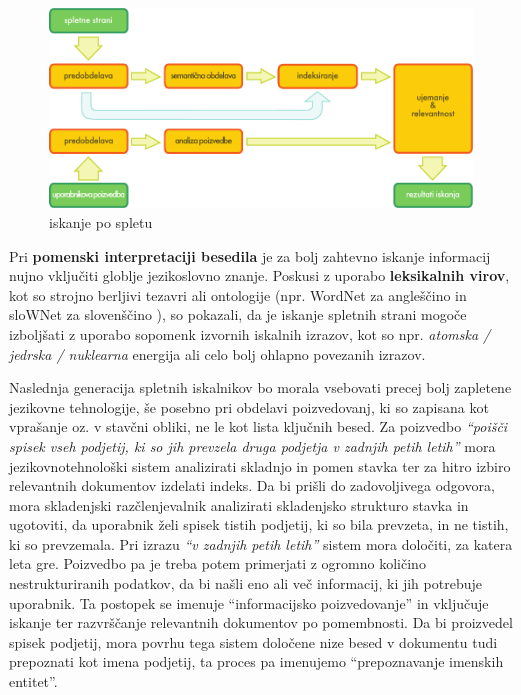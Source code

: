 \begin{multicols}{2}
\begin{figure}[htb]
  \center
  \includegraphics[width=\textwidth]{../_media/slovene/web_search_architecture}
  \caption{iskanje po spletu}
  \label{fig:websearcharch_de}
\end{figure}

Pri \textbf{pomenski interpretaciji besedila} je za bolj zahtevno iskanje informacij nujno vključiti globlje jezikoslovno znanje. Poskusi z uporabo \textbf{leksikalnih virov}, kot so strojno berljivi tezavri ali ontologije (npr. WordNet za angleščino in sloWNet  za slovenščino \cite{slownet1}), so pokazali, da je iskanje spletnih strani mogoče izboljšati z uporabo sopomenk izvornih iskalnih izrazov, kot so npr. \textit{atomska / jedrska / nuklearna} energija ali celo bolj ohlapno povezanih izrazov. 

Naslednja generacija spletnih iskalnikov bo morala vsebovati precej bolj zapletene jezikovne tehnologije, še posebno pri obdelavi poizvedovanj, ki so zapisana kot vprašanje oz. v stavčni obliki, ne le kot lista ključnih besed. Za poizvedbo \textit{“poišči spisek vseh podjetij, ki so jih prevzela druga podjetja v zadnjih petih letih”} mora jezikovnotehnološki sistem analizirati skladnjo in pomen stavka ter za hitro izbiro relevantnih dokumentov izdelati indeks. Da bi prišli do zadovoljivega odgovora, mora skladenj\-ski razčlenjevalnik analizirati skladenjsko strukturo stavka in ugotoviti, da uporabnik želi spisek tistih podjetij, ki so bila prevzeta, in ne tistih, ki so prevzemala. Pri izrazu \textit{“v zadnjih petih letih”} sistem mora določiti, za katera leta gre. Poizvedbo pa je treba potem primerjati z ogromno količino nestrukturiranih podatkov, da bi našli eno ali več informacij, ki jih potrebuje uporabnik. Ta postopek se imenuje “informacijsko poizvedovanje” in vključuje iskanje ter razvrščanje relevantnih dokumentov po pomembnosti. Da bi proizvedel spisek podjetij, mora povrhu tega sistem določene nize besed v dokumentu tudi prepoznati kot imena podjetij, ta proces pa imenujemo “prepoznavanje imenskih entitet”.


\end{multicols}
